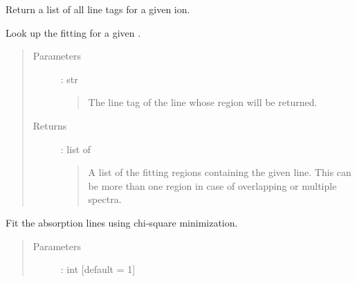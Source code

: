 \documentclass[letterpaper,10pt,english]{sphinxmanual}
\begin{document}
\begin{fulllineitems}
\begin{fulllineitems}
\end{fulllineitems}


\begin{fulllineitems}
\label{\detokenize{api:VoigtFit.DataSet.find_ion}}
Return a list of all line tags for a given ion.

\end{fulllineitems}


\begin{fulllineitems}
\label{\detokenize{api:VoigtFit.DataSet.find_line}}
Look up the fitting {\hyperref[\detokenize{api:regions.Region}]{}} for a given .
\begin{quote}\begin{description}
\item[{Parameters}] \leavevmode
{} : str
\begin{quote}

The line tag of the line whose region will be returned.
\end{quote}

\item[{Returns}] \leavevmode
{} : list of {\hyperref[\detokenize{api:regions.Region}]{}}
\begin{quote}

A list of the fitting regions containing the given line.
This can be more than one region in case of overlapping or multiple spectra.
\end{quote}

\end{description}\end{quote}

\end{fulllineitems}


\begin{fulllineitems}
\label{\detokenize{api:VoigtFit.DataSet.fit}}
Fit the absorption lines using chi-square minimization.
\begin{quote}\begin{description}
\item[{Parameters}] \leavevmode
{} : int   {[}default = 1{]}
\begin{quote}


\end{quote}
\end{description}
\end{quote}
\end{fulllineitems}
\end{fulllineitems}
\end{document}
